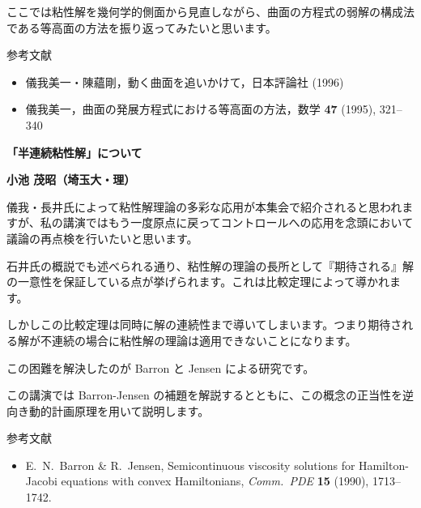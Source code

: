 \documentclass[uplatex,dvipdfmx]{jlreq}
\begin{document}
ここでは粘性解を幾何学的側面から見直しながら、曲面の方程式の弱解の構成法である等高面の方法を振り返ってみたいと思います。

\bigskip

\begin{center}
  {\large 参考文献}
\end{center}

\begin{itemize}
  \setlength{\itemsep}{3pt}
  \item[{[1]}] 儀我美一・陳蘊剛，動く曲面を追いかけて，日本評論社 (1996)
  \item[{[2]}] 儀我美一，曲面の発展方程式における等高面の方法，数学 \textbf{47} (1995), 321--340
\end{itemize}

\newpage

\begin{center}
{\large\bfseries 「半連続粘性解」について}
\end{center}

\begin{flushright}
\textbf{小池 茂昭（埼玉大・理）}
\end{flushright}

儀我・長井氏によって粘性解理論の多彩な応用が本集会で紹介されると思われますが、私の講演ではもう一度原点に戻ってコントロールへの応用を念頭において議論の再点検を行いたいと思います。

石井氏の概説でも述べられる通り、粘性解の理論の長所として『期待される』解の一意性を保証している点が挙げられます。これは比較定理によって導かれます。

しかしこの比較定理は同時に解の連続性まで導いてしまいます。つまり期待される解が不連続の場合に粘性解の理論は適用できないことになります。

この困難を解決したのが Barron と Jensen による研究です。

この講演では Barron-Jensen の補題を解説するとともに、この概念の正当性を逆向き動的計画原理を用いて説明します。

\bigskip

\begin{center}
  {\large 参考文献}
\end{center}

\begin{itemize}
  \setlength{\itemsep}{3pt}
  \item[{[1]}] E.~N.~Barron \& R.~Jensen,
        Semicontinuous viscosity solutions for Hamilton-Jacobi equations with convex Hamiltonians,
        \textit{Comm.\ PDE} \textbf{15} (1990), 1713--1742.
\end{itemize}
\end{document}
